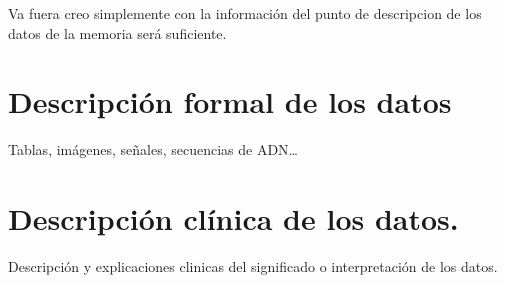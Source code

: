 
Va fuera creo simplemente con la información del punto de descripcion de los datos de la memoria será suficiente.

\section{Descripción formal de los datos}

Tablas, imágenes, señales, secuencias de ADN…
    
\section{Descripción clínica de los datos.}

Descripción y explicaciones clinicas del significado o interpretación de los datos.